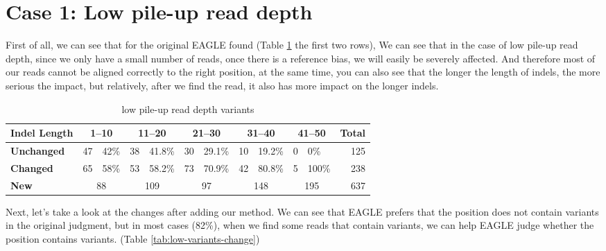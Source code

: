 \section{Case 1: Low pile-up read depth}
First of all, we can see that for the original EAGLE found (Table \ref{tab:low-variants} the first two rows), We can see that in the case of low pile-up read depth, since we only have a small number of reads, once there is a reference bias, we will easily be severely affected. And therefore most of our reads cannot be aligned correctly to the right position, at the same time, you can also see that the longer the length of indels, the more serious the impact, but relatively, after we find the read, it also has more impact on the longer indels.
\vspace{0.5cm}
\begin{table}[ht]
\center
\caption[low pile-up read depth variants]{low pile-up read depth variants}
\vspace{-0.5cm}
\begin{tabular}{|l|l|l|l|l|l|l|l|l|l|l|r|}
\hline
\textbf{Indel Length} & 
\multicolumn{2}{c|}{\textbf{1--10}}  & \multicolumn{2}{c|}{\textbf{11--20}}  & \multicolumn{2}{c|}{\textbf{21--30}}  &
\multicolumn{2}{c|}{\textbf{31--40}}  & \multicolumn{2}{c|}{\textbf{41--50}}   & 
\textbf{Total}\\\hline
\rowcolor{lightgray}
\textbf{Unchanged}  & 
47 & 42\%       &
38 & 41.8\%     &
30 & 29.1\%    &
10 & 19.2\%     &
0 & 0\%          &
125\\ \hline
\textbf{Changed} & 
65 & 58\%       &
53 & 58.2\%     & 
73 & 70.9\%    & 
42 & 80.8\%     &
5 & 100\%        &
238\\ \hline
\rowcolor{lightgray}    
\textbf{New}  & 
\multicolumn{2}{c|}{88}      &
\multicolumn{2}{c|}{109}     &
\multicolumn{2}{c|}{97}      &
\multicolumn{2}{c|}{148}    &
\multicolumn{2}{c|}{195}       & 
637\\ \hline
\end{tabular}
\label{tab:low-variants}
\end{table}

Next, let’s take a look at the changes after adding our method. We can see that EAGLE prefers that the position does not contain variants in the original judgment, but in most cases (82\%), when we find some reads that contain variants, we can help EAGLE judge whether the position contains variants. (Table \ref{tab:low-variants-change})

